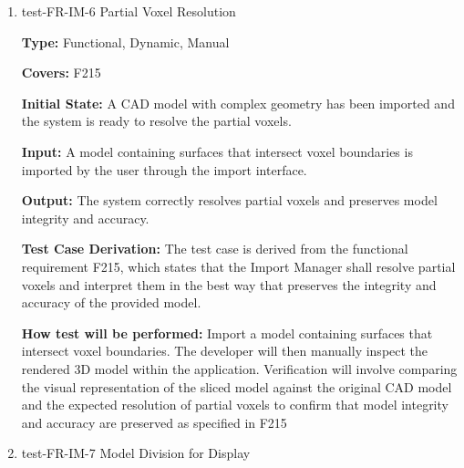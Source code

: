\documentclass[12pt, titlepage]{article}
\begin{document}
\begin{enumerate}
\textbf{Test Case Derivation:} The test case is derived from the functional requirement F214, which states that the Import Manager should allow a user to scale the model to the desired printing size before being sliced into voxels.
					
\textbf{How test will be performed:} Modify the model dimensions to the desired printing size by entering the new dimensions into the system through the import interface by the user. The developer will then manually inspect the rendered 3D model within the application. Verification will involve comparing the visual representation of the sliced model against the original CAD model and the expected scaling of the model to confirm that model integrity and accuracy are preserved as specified in F214

\item{test-FR-IM-6 Partial Voxel Resolution\\}
\label{sec:t-im-6}

\textbf{Type:} Functional, Dynamic, Manual

\textbf{Covers:} F215
					
\textbf{Initial State:} A CAD model with complex geometry has been imported and the system is ready to resolve the partial voxels.
					
\textbf{Input:} A model containing surfaces that intersect voxel boundaries is imported by the user through the import interface.
					
\textbf{Output:} The system correctly resolves partial voxels and preserves model integrity and accuracy.

\textbf{Test Case Derivation:} The test case is derived from the functional requirement F215, which states that the Import Manager shall resolve partial voxels and interpret them in the best way that preserves the integrity and accuracy of the provided model.
					
\textbf{How test will be performed:} Import a model containing surfaces that intersect voxel boundaries. The developer will then manually inspect the rendered 3D model within the application. Verification will involve comparing the visual representation of the sliced model against the original CAD model and the expected resolution of partial voxels to confirm that model integrity and accuracy are preserved as specified in F215

\item{test-FR-IM-7 Model Division for Display\\}
\label{sec:t-im-7}


\end{enumerate}
\end{document}
